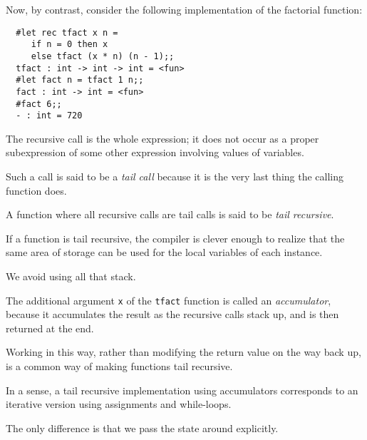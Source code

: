 \begin{slide*}


\vspace*{0.5cm}

Now, by contrast, consider the following implementation of the factorial
function:

\begin{black}\begin{verbatim}
  #let rec tfact x n =
     if n = 0 then x
     else tfact (x * n) (n - 1);;
  tfact : int -> int -> int = <fun>
  #let fact n = tfact 1 n;;
  fact : int -> int = <fun>
  #fact 6;;
  - : int = 720
\end{verbatim}\end{black}

The recursive call is the whole expression; it does not occur as a proper
subexpression of some other expression involving values of variables.

Such a call is said to be a {\em tail call} because it is the very last thing
the calling function does.

A function where all recursive calls are tail calls is said to be {\em tail
recursive}.

\end{slide*}




\begin{slide*}


\vspace*{0.5cm}

If a function is tail recursive, the compiler is clever enough to realize that
the same area of storage can be used for the local variables of each instance.

We avoid using all that stack.

The additional argument {\black \tt x} of the {\black \tt tfact} function is
called an {\em accumulator}, because it accumulates the result as the recursive
calls stack up, and is then returned at the end.

Working in this way, rather than modifying the return value on the way back up,
is a common way of making functions tail recursive.

In a sense, a tail recursive implementation using accumulators corresponds to
an iterative version using assignments and while-loops.

The only difference is that we pass the state around explicitly.

\end{slide*}




